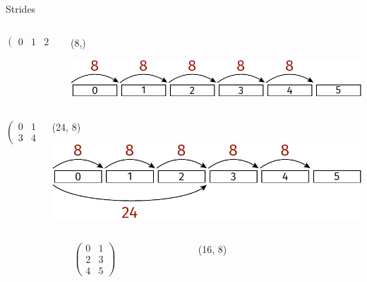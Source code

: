 \documentclass[svgnames]{beamer}
\begin{document}
\begin{frame}{Strides}
 \begin{columns}
  \begin{column}{0.33\textwidth}
   \begin{displaymath}
    \begin{pmatrix}
     0 & 1 & 2 & 3 & 4 & 5
    \end{pmatrix}
   \end{displaymath}
  \end{column}%
  \begin{column}{0.67\textwidth}
   (8,)

   \vspace{0.2truecm}
   \includegraphics[width=\textwidth]{strides_0}
  \end{column}
 \end{columns}

 \vspace{0.8truecm}
 \begin{columns}
  \begin{column}{0.33\textwidth}
   \begin{displaymath}
    \begin{pmatrix}
     0 & 1 & 2\\
     3 & 4 & 5
    \end{pmatrix}
   \end{displaymath}
  \end{column}%
  \begin{column}{0.67\textwidth}
   (24, 8)

   \vspace{0.2truecm}
   \includegraphics[width=\textwidth]{strides_3}
  \end{column}
 \end{columns}

 \vspace{0.8truecm}
 \begin{columns}
  \begin{column}{0.33\textwidth}
   \begin{displaymath}
    \begin{pmatrix}
     0 & 1 \\
     2 & 3 \\
     4 & 5
    \end{pmatrix}
   \end{displaymath}
  \end{column}%
  \begin{column}{0.67\textwidth}
   (16, 8)


\end{column}
\end{columns}
\end{frame}
\end{document}
